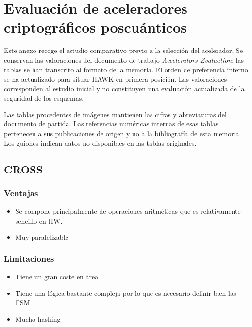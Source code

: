 \chapter{Evaluación de aceleradores criptográficos poscuánticos}
\label{anexo:aceleradores}
\label{app:accelerators-evaluation}

Este anexo recoge el estudio comparativo previo a la selección del acelerador. Se conservan las valoraciones del documento de trabajo \textit{Accelerators Evaluation}; las tablas se han transcrito al formato de la memoria. El orden de preferencia interno se ha actualizado para situar HAWK en primera posición. Las valoraciones corresponden al estudio inicial y no constituyen una evaluación actualizada de la seguridad de los esquemas.

Las tablas procedentes de imágenes mantienen las cifras y abreviaturas del documento de partida. Las referencias numéricas internas de esas tablas pertenecen a sus publicaciones de origen y no a la bibliografía de esta memoria. Los guiones indican datos no disponibles en las tablas originales.


\section{CROSS}

\subsection*{Ventajas}
\begin{itemize}
\item Se compone principalmente de operaciones aritméticas que es relativamente sencillo en HW.
\item Muy paralelizable
\end{itemize}

\subsection*{Limitaciones}
\begin{itemize}
\item Tiene un gran coste en área
\item Tiene una lógica bastante compleja por lo que es necesario definir bien las FSM.
\item Mucho hashing
\end{itemize}


